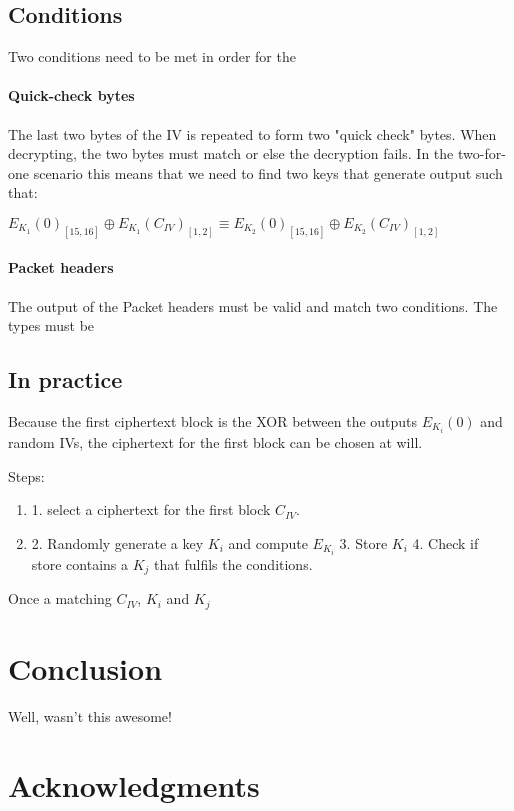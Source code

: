 \documentclass[runningheads,a4paper]{llncs}[2018/03/10]
\newif\ifanon
\begin{document}
\subsection{Conditions}\label{sec:conditions}

Two conditions need to be met in order for the 

\paragraph{Quick-check bytes}
The last two bytes of the IV is repeated to form two "quick check" bytes. When 
decrypting, the two bytes must match or else the decryption fails. In the 
two-for-one scenario this means that we need to find two keys that generate output such that:

$E_{K_1}(0)_{[15,16]} \oplus E_{K_1}(C_{IV})_{[1,2]} \equiv E_{K_2}(0)_{[15,16]} 
\oplus E_{K_2}(C_{IV})_{[1,2]}$


\paragraph{Packet headers}

The output of the Packet headers must be valid and match two conditions. The 
types must be 

\subsection{In practice}\label{sec:in-practice}

Because the first ciphertext block is the XOR between the outputs $E_{K_i}(0)$ 
and random IVs, the ciphertext for the first block can be chosen at will. 


Steps:
\begin{enumerate}

	\item 1. select a ciphertext for the first block $C_{IV}$.
	\item 2. Randomly generate a key $K_i$ and compute $E_{K_i}$
3. Store $K_i$ 
4. Check if store contains a $K_j$ that fulfils the conditions.

\end{enumerate}
Once a matching $C_{IV}$, $K_i$ and $K_j$


\section{Conclusion}\label{sec:conclusion}
Well, wasn't this awesome!

\section*{Acknowledgments}
\ifanon
	Removed for blind review.
\else
	
\fi

\clearpage



\end{document}
